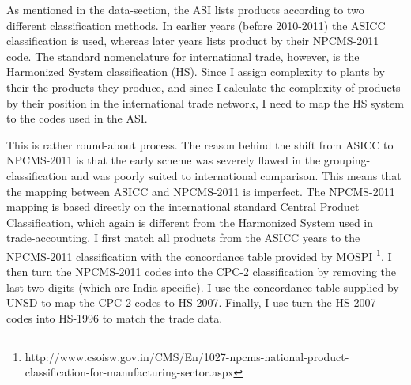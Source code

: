As mentioned in the data-section, the ASI lists products according to two different classification methods. In earlier years (before 2010-2011) the ASICC classification is used, whereas later years lists product by their NPCMS-2011 code. The standard nomenclature for international trade, however, is the Harmonized System classification (HS). Since I assign complexity to plants by their the products they produce, and since I calculate the complexity of products by their position in the international trade network, I need to map the HS system to the codes used in the ASI.

This is rather round-about process. The reason behind the shift from ASICC to NPCMS-2011 is that the early scheme was severely flawed in the grouping-classification and was poorly suited to international comparison. This means that the mapping between ASICC and NPCMS-2011 is imperfect. The NPCMS-2011 mapping is based directly on the international standard Central Product Classification, which again is different from the Harmonized System used in trade-accounting. I first match all products from the ASICC years to the NPCMS-2011 classification with the concordance table provided by MOSPI \footnote{http://www.csoisw.gov.in/CMS/En/1027-npcms-national-product-classification-for-manufacturing-sector.aspx}. I then turn the NPCMS-2011 codes into the CPC-2 classification by removing the last two digits (which are India specific). I use the concordance table supplied by UNSD to map the CPC-2 codes to HS-2007. Finally, I use turn the HS-2007 codes into HS-1996 to match the trade data. 

